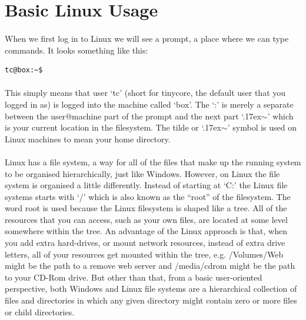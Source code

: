 \documentclass[12pt, a4paper, twoside]{book}
\begin{document}
\section{Basic Linux Usage}
\label{linux}

\paragraph{} When we first log in to Linux we will see a prompt, a place where we can type commands. It looks something like this:

\begin{lstlisting}[style=DOS]
    tc@box:~$ 
\end{lstlisting}
\paragraph{} This simply means that user `tc' (short for tinycore, the default user that you logged in as) is logged into the machine called `box'. The `:' is merely a separate between the user@machine part of the prompt and the next part `{\raise.17ex\hbox{$\scriptstyle\sim$}}' which is your current location in the filesystem. The tilde or `{\raise.17ex\hbox{$\scriptstyle\sim$}}' symbol is used on Linux machines to mean your home directory.

\paragraph{} Linux has a file system, a way for all of the files that make up the running system to be organised hierarchically, just like Windows. However, on Linux the file system is organised a little differently. Instead of starting at `C:' the Linux file systems starts with `/' which is also known as the ``root'' of the filesystem. The word root is used because the Linux filesystem is shaped like a tree. All of the resources that you can access, such as your own files, are located at some level somewhere within the tree. An advantage of the Linux approach is that, when you add extra hard-drives, or mount network resources, instead of extra drive letters, all of your resources get mounted within the tree, e.g. /Volumes/Web might be the path to a remove web server and /media/cdrom might be the path to your CD-Rom drive. But other than that, from a basic user-oriented perspective, both Windows and Linux file systems are a hierarchical collection of files and directories in which any given directory might contain zero or more files or child directories.
\end{document}
